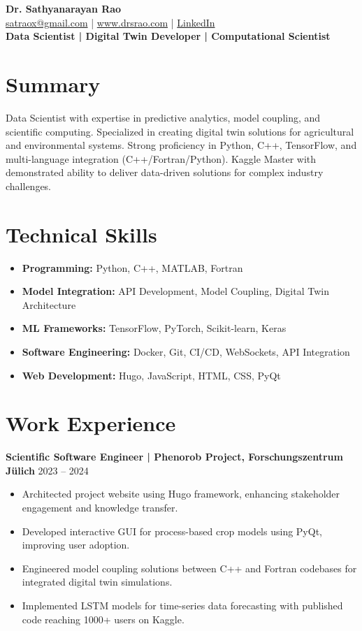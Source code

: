 \documentclass[11pt,a4paper]{article}
\begin{document}
\begin{center}
    {\huge \textbf{Dr. Sathyanarayan Rao}} \\
    \href{mailto:satraox@gmail.com}{satraox@gmail.com} | 
    \href{http://www.drsrao.com}{www.drsrao.com} | 
    \href{https://www.linkedin.com/in/sathyanarayan-rao}{LinkedIn} \\
    \textbf{Data Scientist | Digital Twin Developer | Computational Scientist} \\
\end{center}

\section*{Summary}
Data Scientist with expertise in predictive analytics, model coupling, and scientific computing. 
Specialized in creating digital twin solutions for agricultural and environmental systems.
Strong proficiency in Python, C++, TensorFlow, and multi-language integration (C++/Fortran/Python). 
Kaggle Master with demonstrated ability to deliver data-driven solutions for complex industry challenges.

\section*{Technical Skills}
\begin{itemize}[leftmargin=*]
    \item \textbf{Programming:} Python, C++, MATLAB, Fortran
    \item \textbf{Model Integration:} API Development, Model Coupling, Digital Twin Architecture
    \item \textbf{ML Frameworks:} TensorFlow, PyTorch, Scikit-learn, Keras
    \item \textbf{Software Engineering:} Docker, Git, CI/CD, WebSockets, API Integration
    \item \textbf{Web Development:} Hugo, JavaScript, HTML, CSS, PyQt
\end{itemize}

\section*{Work Experience}

\textbf{Scientific Software Engineer | Phenorob Project, Forschungszentrum Jülich} \hfill 2023 – 2024  
\begin{itemize}[leftmargin=*]
    \item Architected project website using Hugo framework, enhancing stakeholder engagement and knowledge transfer.
    \item Developed interactive GUI for process-based crop models using PyQt, improving user adoption.
    \item Engineered model coupling solutions between C++ and Fortran codebases for integrated digital twin simulations.
    \item Implemented LSTM models for time-series data forecasting with published code reaching 1000+ users on Kaggle.
\end{itemize}
\end{document}
